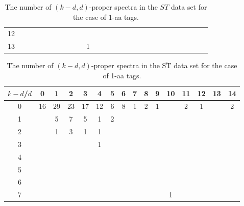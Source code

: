 \documentclass{article}[12pt]
\def\STbar{{\overline{\mathrm{ST}}}}
\begin{document}
\begin{landscape}
\begin{table}[h]
{\begin{tabular}{|c|c|
c|c|c|c|c|c|c|c|c|c|c|c|c|c|c|c|c|c|c|c|c|c|c|c|c|}
12  &  &  &  &  &  &  &  &  &  &  &  &  &  &  &  &  &  &  &  &  &  &  &  &  &  & \\

13  &  &  &  &  &  &  &  &  &  & 1 &  &  &  &  &  &  &  &  &  &  &  &  &  &  &  & \\

  \hline
\end{tabular}
\par}
\centering
\caption{The number of $(k-d,d)$-proper spectra in the $ST$ data set for the case of 1-aa tags.}
\vspace{3mm}
\label{table:kd-1-proper-ST}
\end{table}
\end{landscape}
\begin{landscape}

\begin{table}[h]\footnotesize
{\centering
\begin{tabular}{|c|c|
c|c|c|c|c|c|c|c|c|c|c|c|c|c|}
  \hline
  $k-d$/$d$ 
 & 0 & 1 & 2 & 3 & 4 & 5 & 6 & 7 & 8 & 9 & 10 & 11 & 12 & 13 & 14\\

  \hline
  \hline

0  & 16 & 29 & 23 & 17 & 12 & 6 & 8 & 1 & 2 & 1 &  & 2 & 1 &  & 2\\

1  &  & 5 & 7 & 5 & 1 & 2 &  &  &  &  &  &  &  &  & \\

2  &  & 1 & 3 & 1 & 1 &  &  &  &  &  &  &  &  &  & \\

3  &  &  &  &  & 1 &  &  &  &  &  &  &  &  &  & \\

4  &  &  &  &  &  &  &  &  &  &  &  &  &  &  & \\

5  &  &  &  &  &  &  &  &  &  &  &  &  &  &  & \\

6  &  &  &  &  &  &  &  &  &  &  &  &  &  &  & \\

7  &  &  &  &  &  &  &  &  &  &  & 1 &  &  &  & \\

  \hline
\end{tabular}
\par}
\centering
\caption{The number of $(k-d,d)$-proper spectra in the $\STbar$ data set for the case of 1-aa tags.}
\vspace{3mm}
\label{table:kd-1-proper-ST-bar}
\end{table}
\end{landscape}
\end{document}
